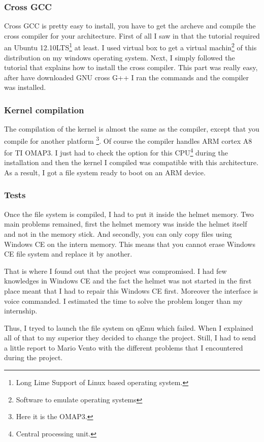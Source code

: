	\subsubsection{Cross GCC}
	
	\par Cross GCC is pretty easy to install, you have to get the archeve and compile the cross compiler for your architecture. First of all I saw in that the tutorial required an Ubuntu 12.10LTS\footnote{Long Lime Support of Linux based operating system.} at least. I used virtual box to get a virtual machin\footnote{Software to emulate operating systems} of this distribution on my windows operating system. Next, I simply followed the tutorial that explains how to install the cross compiler. This part was really easy, after have downloaded GNU cross G++ I ran the commands and the compiler was installed.
	
	\subsubsection{Kernel compilation}
	
	\par The compilation of the kernel is almost the same as the compiler, except that you compile for another platform \footnote{Here it is the OMAP3.}. Of course the compiler handles ARM cortex A8 for TI OMAP3. I just had to check the option for this CPU\footnote{Central processing unit.} during the installation and then the kernel I compiled was compatible with this architecture. As a result, I got a file system ready to boot on an ARM device.
	
	
	\subsubsection{Tests}
	
	\par Once the file system is compiled, I had to put it inside the helmet memory. Two main problems remained, first the helmet memory was inside the helmet itself and not in the memory stick. And secondly, you can only copy files using Windows CE on the intern memory. This means that you cannot erase Windows CE file system and replace it by another.
	\par That is where I found out that the project was compromised. I had few knowledges in Windows CE and the fact the helmet was not started in the first place meant that I had to repair this Windows CE first. Moreover the interface is voice commanded. I estimated the time to solve the problem longer than my internship.
	\par Thus, I tryed to launch the file system on qEmu which failed. When I explained all of that to my superior they decided to change the project. Still, I had to send a little report to Mario Vento with the different problems that I encountered during the project.
	
